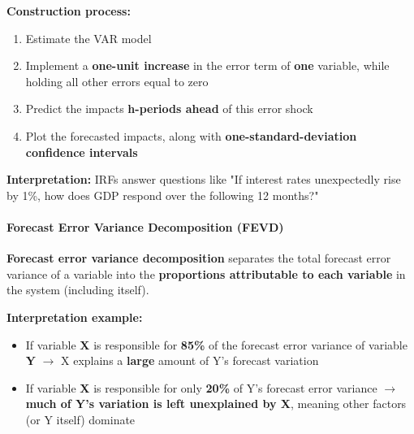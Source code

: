 \documentclass[12pt,openany]{book}
\begin{document}
\textbf{Construction process:}
\begin{enumerate}[leftmargin=*]
    \item Estimate the VAR model
    \item Implement a \textbf{one-unit increase} in the error term of \textbf{one} variable, while holding all other errors equal to zero
    \item Predict the impacts \textbf{h-periods ahead} of this error shock
    \item Plot the forecasted impacts, along with \textbf{one-standard-deviation confidence intervals}
\end{enumerate}


\begin{center}
\end{center}


\textbf{Interpretation:} IRFs answer questions like "If interest rates unexpectedly rise by 1\%, how does GDP respond over the following 12 months?"

\paragraph{Forecast Error Variance Decomposition (FEVD)}

\textbf{Forecast error variance decomposition} separates the total forecast error variance of a variable into the \textbf{proportions attributable to each variable} in the system (including itself).

\textbf{Interpretation example:}
\begin{itemize}[leftmargin=*]
    \item If variable \textbf{X} is responsible for \textbf{85\%} of the forecast error variance of variable \textbf{Y} \(\rightarrow\) X explains a \textbf{large} amount of Y's forecast variation
    \item If variable \textbf{X} is responsible for only \textbf{20\%} of Y's forecast error variance \(\rightarrow\) \textbf{much of Y's variation is left unexplained by X}, meaning other factors (or Y itself) dominate
\end{itemize}
\end{document}
